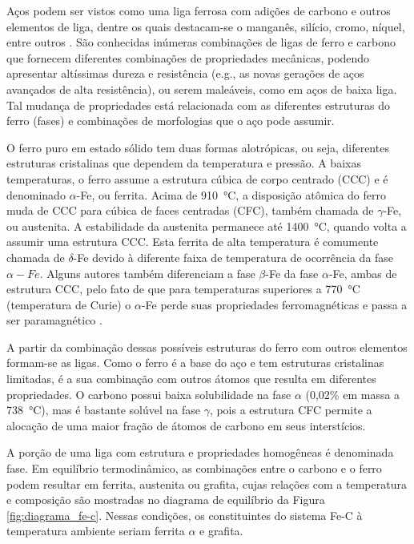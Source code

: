 \documentclass[brazil,tf,epusp]{usp}  %
\begin{document}
Aços podem ser vistos como uma liga ferrosa com adições de carbono e outros elementos de liga, dentre os quais destacam-se o manganês, silício, cromo, níquel, entre outros \cite{Dossett2006}. São conhecidas inúmeras combinações de ligas de ferro e carbono que fornecem diferentes combinações de propriedades mecânicas, podendo apresentar altíssimas dureza e resistência (e.g., as novas gerações de aços avançados de alta resistência), ou serem maleáveis, como em aços de baixa liga. Tal mudança de propriedades está relacionada com as diferentes estruturas do ferro (fases) e combinações de morfologias que o aço pode assumir.

O ferro puro em estado sólido tem duas formas alotrópicas, ou seja, diferentes estruturas cristalinas que dependem da temperatura e pressão. A baixas temperaturas, o ferro assume a estrutura cúbica de corpo centrado (CCC) e é denominado $\alpha$-Fe, ou ferrita. Acima de 910~°C, a disposição atômica do ferro muda de CCC para cúbica de faces centradas (CFC), também chamada de $\gamma$-Fe, ou austenita. A estabilidade da austenita permanece até 1400~°C, quando volta a assumir uma estrutura CCC. Esta ferrita de alta temperatura é comumente chamada de $\delta$-Fe devido à diferente faixa de temperatura de ocorrência da fase $\alpha-Fe$. Alguns autores também diferenciam a fase $\beta$-Fe da fase $\alpha$-Fe, ambas de estrutura CCC, pelo fato de que para temperaturas superiores a 770~°C (temperatura de Curie) o $\alpha$-Fe perde suas propriedades ferromagnéticas e passa a ser paramagnético \cite{Totten2006}.

A partir da combinação dessas possíveis estruturas do ferro com outros elementos formam-se as ligas. Como o ferro é a base do aço e tem estruturas cristalinas limitadas, é a sua combinação com outros átomos que resulta em diferentes propriedades. O carbono possui baixa solubilidade na fase $\alpha$ (0,02\% em massa a 738~°C), mas é bastante solúvel na fase $\gamma$, pois a estrutura CFC permite a alocação de uma maior fração de átomos de carbono em seus interstícios.

A porção de uma liga com estrutura e propriedades homogêneas é denominada fase. Em equilíbrio termodinâmico, as combinações entre o carbono e o ferro podem resultar em ferrita, austenita ou grafita, cujas relações com a temperatura e composição são mostradas no diagrama de equilíbrio da Figura \ref{fig:diagrama_fe-c}. Nessas condições, os constituintes do sistema Fe-C à temperatura ambiente seriam ferrita $\alpha$ e grafita.
\end{document}
